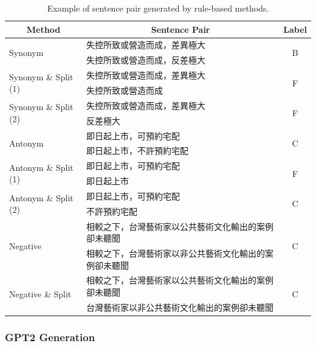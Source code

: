 \documentclass[12pt]{article}
\begin{document}
\begin{CJK*}{UTF8}{bkai}
\begin{spacing}{1.77}
\begin{table}[H]
  \centering
  \setlength{\extrarowheight}{-3pt}
  \begin{tabular}{|l|l|c|}
    \hline
    \multicolumn{1}{|c|}{Method} & \multicolumn{1}{c|}{Sentence Pair} & Label \\ \hline
    \multirow{2}{*}{Synonym} & 失控所致或營造而成，差異極大 & \multirow{2}{*}{B} \\ \cline{2-2}
    & 失控所致或營造而成，反差極大 &  \\ \hline
    \multirow{2}{*}{Synonym \& Split (1)} & 失控所致或營造而成，差異極大 & \multirow{2}{*}{F} \\ \cline{2-2}
    & 失控所致或營造而成 &  \\ \hline
    \multirow{2}{*}{Synonym \& Split (2)} & 失控所致或營造而成，差異極大 & \multirow{2}{*}{F} \\ \cline{2-2}
    & 反差極大 &  \\ \hline
    \multirow{2}{*}{Antonym} & 即日起上市，可預約宅配 & \multirow{2}{*}{C} \\ \cline{2-2}
    & 即日起上市，不許預約宅配 &  \\ \hline
    \multirow{2}{*}{Antonym \& Split (1)} & 即日起上市，可預約宅配 & \multirow{2}{*}{F} \\ \cline{2-2}
    & 即日起上市 &  \\ \hline
    \multirow{2}{*}{Antonym \& Split (2)} & 即日起上市，可預約宅配 & \multirow{2}{*}{C} \\ \cline{2-2}
    & 不許預約宅配 &  \\ \hline
    \multirow{2}{*}{Negative} & 相較之下，台灣藝術家以公共藝術文化輸出的案例卻未聽聞 & \multirow{2}{*}{C} \\ \cline{2-2}
    & 相較之下，台灣藝術家以非公共藝術文化輸出的案例卻未聽聞 &  \\ \hline
    \multirow{2}{*}{Negative \& Split} & 相較之下，台灣藝術家以公共藝術文化輸出的案例卻未聽聞 & \multirow{2}{*}{C} \\ \cline{2-2}
    & 台灣藝術家以非公共藝術文化輸出的案例卻未聽聞 &  \\ \hline
  \end{tabular}
  \caption{Example of sentence pair generated by rule-based methods.}
  \label{example:sim_nli_rule_based}
\end{table}

\subsubsection{GPT2 Generation}

\end{spacing}
\end{CJK*}
\end{document}
